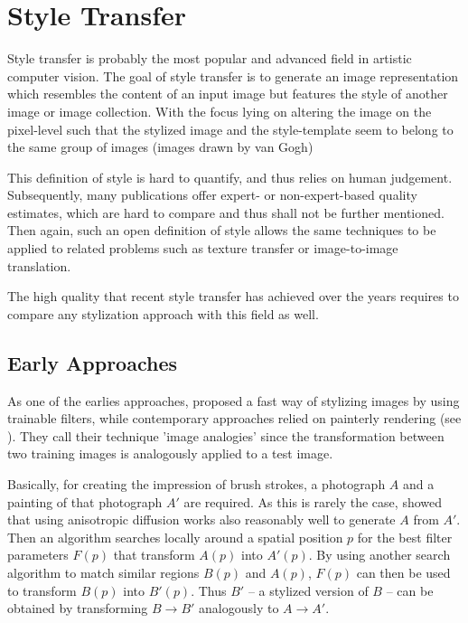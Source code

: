 \section{Style Transfer}

Style transfer is probably the most popular and advanced field in artistic computer vision.
The goal of style transfer is to generate an image representation which resembles the content of an input image but features the style of another image or image collection.
With the focus lying on altering the image on the pixel-level such that the stylized image and the style-template seem to belong to the same group of images (\eg images drawn by van Gogh)

This definition of style is hard to quantify, and thus relies on human judgement.
Subsequently, many publications offer expert- or non-expert-based quality estimates, which are hard to compare and thus shall not be further mentioned.
Then again, such an open definition of style allows the same techniques to be applied to related problems such as texture transfer or image-to-image translation.

The high quality that recent style transfer has achieved over the years requires to compare any stylization approach with this field as well.

\subsection{Early Approaches}

As one of the earlies approaches, \citeauthor*{imageanalogies} proposed a fast way of stylizing images by using trainable filters, while contemporary approaches relied on painterly rendering (see ).
They call their technique 'image analogies' since the transformation between two training images is analogously applied to a test image.

Basically, for creating the impression of brush strokes, a photograph $A$ and a painting of that photograph $A'$ are required.
As this is rarely the case, \citeauthor*{imageanalogies} showed that using anisotropic diffusion works also reasonably well to generate $A$ from $A'$.
Then an algorithm searches locally around a spatial position $p$ for the best filter parameters $F(p)$ that transform $A(p)$ into $A'(p)$.
By using another search algorithm to match similar regions $B(p)$ and $A(p)$, $F(p)$ can then be used to transform $B(p)$ into $B'(p)$.
Thus $B'$ -- a stylized version of $B$ -- can be obtained by transforming $B \rightarrow B'$ analogously to $A \rightarrow A'$.

